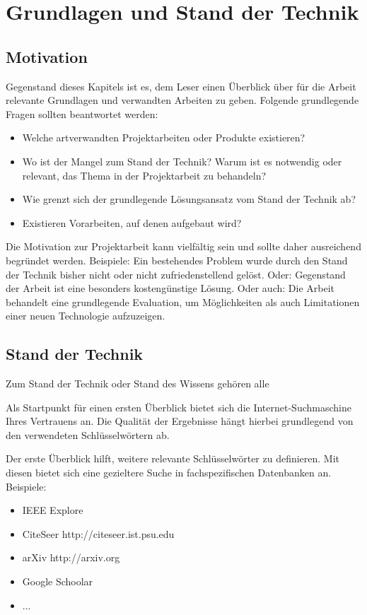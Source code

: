 
\chapter{Grundlagen und Stand der Technik}

\section{Motivation}
Gegenstand dieses Kapitels ist es, dem Leser einen Überblick über für die Arbeit relevante Grundlagen und verwandten Arbeiten zu geben. Folgende grundlegende Fragen sollten beantwortet werden:
\begin{itemize}
	\item Welche artverwandten Projektarbeiten oder Produkte existieren?
	\item Wo ist der Mangel zum Stand der Technik? Warum ist es notwendig oder relevant, das Thema in der Projektarbeit zu behandeln? 
	\item Wie grenzt sich der grundlegende Lösungsansatz vom Stand der Technik ab?
	\item Existieren Vorarbeiten, auf denen aufgebaut wird?
\end{itemize}

Die Motivation zur Projektarbeit kann vielfältig sein und sollte daher ausreichend begründet werden. Beispiele: Ein bestehendes Problem wurde durch den Stand der Technik bisher nicht oder nicht zufriedenstellend gelöst. Oder: Gegenstand der Arbeit ist eine besonders kostengünstige Lösung. Oder auch: Die Arbeit behandelt eine grundlegende Evaluation, um Möglichkeiten als auch Limitationen einer neuen Technologie aufzuzeigen.

\section{Stand der Technik}

Zum Stand der Technik oder Stand des Wissens gehören alle 

Als Startpunkt für einen ersten Überblick bietet sich die Internet-Suchmaschine Ihres Vertrauens an. Die Qualität der Ergebnisse hängt hierbei grundlegend von den verwendeten Schlüsselwörtern ab. 

Der erste Überblick hilft, weitere relevante Schlüsselwörter zu definieren. Mit diesen bietet sich eine gezieltere Suche in fachspezifischen Datenbanken an. Beispiele:

\begin{itemize}
\item IEEE Explore
\item CiteSeer http://citeseer.ist.psu.edu
\item arXiv http://arxiv.org
\item Google Schoolar
\item ...
\end{itemize}

